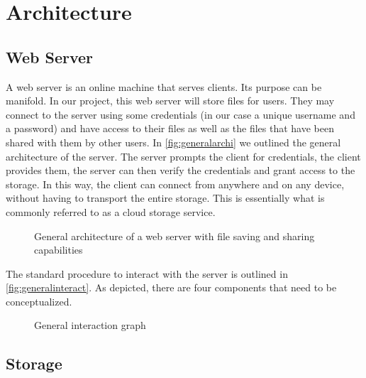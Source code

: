 \section{Architecture}
\subsection{Web Server}

\begin{minipage}{0.44\textwidth}
    A web server is an online machine that serves clients. Its purpose can be manifold. In our project, this web server will store files for users. They may connect to the server using some credentials (in our case a unique username and a password) and have access to their files as well as the files that have been shared with them by other users. In \autoref{fig:generalarchi} we outlined the general architecture of the server. The server prompts the client for credentials, the client provides them, the server can then verify the credentials and grant access to the storage. In this way, the client can connect from anywhere and on any device, without having to transport the entire storage. This is essentially what is commonly referred to as a cloud storage service.
\end{minipage}
\begin{minipage}{0.47\textwidth}
    \begin{figure}[H]
        
        \caption{\label{fig:generalarchi} General architecture of a web server with file saving and sharing capabilities }
    \end{figure}
\end{minipage}


The standard procedure to interact with the server is outlined in \autoref{fig:generalinteract}. As depicted, there are four components that need to be conceptualized.

\begin{minipage}{1\textwidth}
    \begin{figure}[H]
        \centering
        
        \caption{\label{fig:generalinteract} General interaction graph }
    \end{figure}
\end{minipage}

\subsection{Storage}

